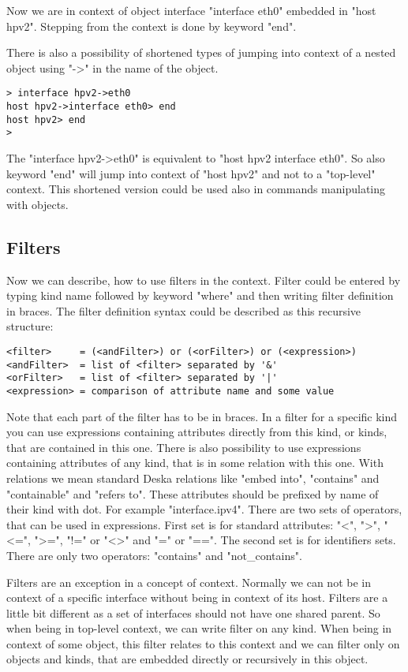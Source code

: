 \documentclass[deska]{subfiles}
\begin{document}
Now we are in context of object interface "interface eth0" embedded in "host hpv2". Stepping from the context is done by
keyword "end".

There is also a possibility of shortened types of jumping into context of a nested object using "->" in the name of the
object.

\begin{verbatim}
> interface hpv2->eth0
host hpv2->interface eth0> end
host hpv2> end
>
\end{verbatim}

The "interface hpv2->eth0" is equivalent to "host hpv2 interface eth0". So also keyword "end" will jump into context of
"host hpv2" and not to a "top-level" context. This shortened version could be used also in commands manipulating with
objects.

\subsection{Filters}

Now we can describe, how to use filters in the context. Filter could be entered by typing kind name followed by keyword
"where" and then writing filter definition in braces. The filter definition syntax could be described as this recursive
structure:

\begin{verbatim}
<filter>     = (<andFilter>) or (<orFilter>) or (<expression>)
<andFilter>  = list of <filter> separated by '&'
<orFilter>   = list of <filter> separated by '|'
<expression> = comparison of attribute name and some value
\end{verbatim}

Note that each part of the filter has to be in braces. In a filter for a specific kind you can use expressions containing
attributes directly from this kind, or kinds, that are contained in this one. There is also possibility to use expressions
containing attributes of any kind, that is in some relation with this one. With relations we mean standard Deska relations
like "embed into", "contains" and "containable" and "refers to". These attributes should be prefixed by name of their
kind with dot. For example "interface.ipv4". There are two sets of operators, that can be used in expressions. First
set is for standard attributes: "<", ">", "<=", ">=", "!=" or "<>" and "=" or "==". The second set is for identifiers
sets. There are only two operators: "contains" and "not\_contains".

Filters are an exception in a concept of context. Normally we can not be in context of a specific interface without being
in context of its host. Filters are a little bit different as a set of interfaces should not have one shared parent. So
when being in top-level context, we can write filter on any kind. When being in context of some object, this filter
relates to this context and we can filter only on objects and kinds, that are embedded directly or recursively in this object.
\end{document}
